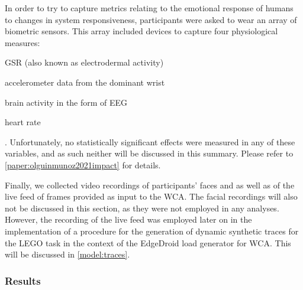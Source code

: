 In order to try to capture metrics relating to the emotional response of humans to changes in system responsiveness, participants were asked to wear an array of biometric sensors.
This array included devices to capture four physiological measures:
\begin{inlineenum}
    [itemjoin={{, }}, itemjoin*={{, and }}, label={(\arabic*)}]
    \item \gls{GSR} (also known as electrodermal activity)
    \item accelerometer data from the dominant wrist
    \item brain activity in the form of \gls{EEG}
    \item heart rate
\end{inlineenum}.
Unfortunately, no statistically significant effects were measured in any of these variables, and as such neither will be discussed in this summary.
Please refer to \cref{paper:olguinmunoz2021impact} for details.

Finally, we collected video recordings of participants' faces and as well as of the live feed of frames provided as input to the \gls{WCA}.
The facial recordings will also not be discussed in this section, as they were not employed in any analyses.
However, the recording of the live feed was employed later on in the implementation of a procedure for the generation of dynamic synthetic traces for the LEGO task in the context of the EdgeDroid load generator for \gls{WCA}.
This will be discussed in \cref{model:traces}.

\subsubsection{Results}\label{impact:results}

